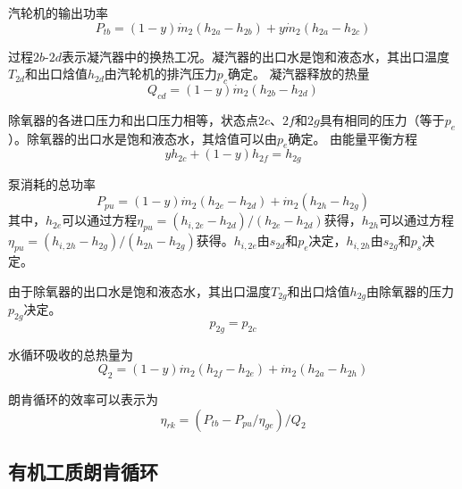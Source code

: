   汽轮机的输出功率
  \begin{equation}
  P_{tb}=\left(1-y\right)\dot{m}_{2}\left(h_{2a}-h_{2b}\right)+y\dot{m}_{2}\left(h_{2a}-h_{2c}\right)
  \end{equation}
  
  过程$2b$-$2d$表示凝汽器中的换热工况。凝汽器的出口水是饱和液态水，其出口温度$T_{2d}$和出口焓值$h_{2d}$由汽轮机的排汽压力$p_c$确定。
  凝汽器释放的热量
  \begin{equation}
      Q_{cd} = (1-y)\dot{m}_2 (h_{2b} - h_{2d})
\end{equation}

  除氧器的各进口压力和出口压力相等，状态点$2c$、$2f$和$2g$具有相同的压力（等于$p_e$）。除氧器的出口水是饱和液态水，其焓值可以由$p_e$确定。
  由能量平衡方程
  \begin{equation}
  y h_{2c} + (1-y) h_{2f} = h_{2g}
\end{equation}
 
  泵消耗的总功率
\begin{equation}
	P_{pu}=\left(1-y\right)\dot{m}_{2}\left(h_{2e}-h_{2d}\right)+\dot{m}_{2}\left(h_{2h}-h_{2g}\right)
\end{equation}
其中，$h_{2e}$可以通过方程$\eta_{pu} = (h_{i,2e}-h_{2d})/(h_{2e}-h_{2d})$获得，$h_{2h}$可以通过方程$\eta_{pu} = (h_{i,2h}-h_{2g})/(h_{2h}-h_{2g})$获得。$h_{i,2e}$由$s_{2d}$和$p_e$决定，$h_{i,2h}$由$s_{2g}$和$p_s$决定。

由于除氧器的出口水是饱和液态水，其出口温度$T_{2g}$和出口焓值$h_{2g}$由除氧器的压力$p_{2g}$决定。
\begin{equation}
  p_{2g} = p_{2c}
\end{equation}
    
水循环吸收的总热量为
\begin{equation}
	Q_2=\left(1-y\right)\dot{m}_{2}\left(h_{2f}-h_{2e}\right)+\dot{m}_{2}\left(h_{2a}-h_{2h}\right)
\end{equation}

朗肯循环的效率可以表示为
\begin{equation}
	\eta_{rk}=(P_{tb}-P_{pu}/\eta_{ge})/Q_{2}
\end{equation}

\subsection{有机工质朗肯循环}
  
